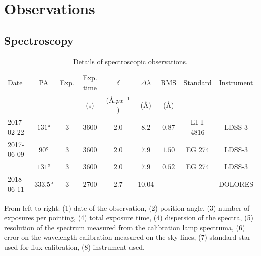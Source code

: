 \documentclass[../thesis.tex]{subfiles}
\begin{document}
\section{Observations}
\label{sec:obs}

\subsection{Spectroscopy}
\label{sec:obs_spec}

\begin{table}
    \centering
    \caption{Details of spectroscopic observations.}
    \label{tab:obs_spec}
    \small
    \begin{threeparttable}
    \begin{tabular}{lcccccccc}
    \hline
    \hline
    Date& PA & Exp.& Exp. time & $\delta$ & $\Delta\lambda$ & RMS &Standard&Instrument\\
    & & & (s) & ($\si{\angstrom.px^{-1}}$)& ($\si{\angstrom}$)& ($\si{\angstrom}$) & &\\   
    \hline
    2017-02-22 & $\ang{131}$ & $3$ & $3600$ & $2.0$ & $8.2$ & $0.87$ & LTT 4816&LDSS-3\\
    2017-06-09 & $\ang{90}$  & $3$ & $3600$ & $2.0$ & $7.9$ & $1.50$ & EG 274&LDSS-3\\
               & $\ang{131}$ & $3$ & $3600$ & $2.0$ & $7.9$ & $0.52$ & EG 274&LDSS-3\\
    2018-06-11 & $\ang{333.5}$ & $3$ & $2700$& $2.7$ &$10.04$&-&-& DOLORES\\
    \hline
    \end{tabular}
    \normalsize
    \begin{tablenotes}
    \item From left to right: (1) date of the observation, (2) position angle, (3) number of exposures per pointing, (4) total exposure time, (4) dispersion of the spectra, (5) resolution of the spectrum measured from the calibration lamp spectruma, (6) error on the wavelength calibration measured on the sky lines, (7) standard star used for flux calibration, (8) instrument used.
    \end{tablenotes}
    \end{threeparttable}
\end{table}
\end{document}
